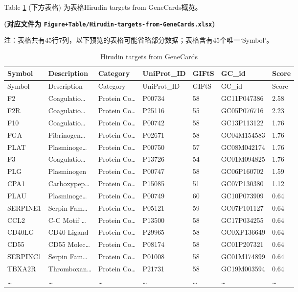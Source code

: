 \documentclass[
]{article}
\begin{document}
Table \ref{tab:Hirudin-targets-from-GeneCards} (下方表格) 为表格Hirudin targets from GeneCards概览。

\textbf{(对应文件为 \texttt{Figure+Table/Hirudin-targets-from-GeneCards.xlsx})}

\begin{center}\begin{tcolorbox}[colback=gray!10, colframe=gray!50, width=0.9\linewidth, arc=1mm, boxrule=0.5pt]注：表格共有45行7列，以下预览的表格可能省略部分数据；表格含有45个唯一`Symbol'。
\end{tcolorbox}
\end{center}

\begin{longtable}[]{@{}lllllll@{}}
\caption{\label{tab:Hirudin-targets-from-GeneCards}Hirudin targets from GeneCards}\tabularnewline
\toprule
Symbol & Description & Category & UniProt\_ID & GIFtS & GC\_id & Score\tabularnewline
\midrule
\endfirsthead
\toprule
Symbol & Description & Category & UniProt\_ID & GIFtS & GC\_id & Score\tabularnewline
\midrule
\endhead
F2 & Coagulatio\ldots{} & Protein Co\ldots{} & P00734 & 58 & GC11P047386 & 2.58\tabularnewline
F2R & Coagulatio\ldots{} & Protein Co\ldots{} & P25116 & 55 & GC05P076716 & 2.23\tabularnewline
F10 & Coagulatio\ldots{} & Protein Co\ldots{} & P00742 & 58 & GC13P113122 & 1.76\tabularnewline
FGA & Fibrinogen\ldots{} & Protein Co\ldots{} & P02671 & 58 & GC04M154583 & 1.76\tabularnewline
PLAT & Plasminoge\ldots{} & Protein Co\ldots{} & P00750 & 57 & GC08M042174 & 1.76\tabularnewline
F3 & Coagulatio\ldots{} & Protein Co\ldots{} & P13726 & 54 & GC01M094825 & 1.76\tabularnewline
PLG & Plasminogen & Protein Co\ldots{} & P00747 & 58 & GC06P160702 & 1.59\tabularnewline
CPA1 & Carboxypep\ldots{} & Protein Co\ldots{} & P15085 & 51 & GC07P130380 & 1.12\tabularnewline
PLAU & Plasminoge\ldots{} & Protein Co\ldots{} & P00749 & 60 & GC10P073909 & 0.64\tabularnewline
SERPINE1 & Serpin Fam\ldots{} & Protein Co\ldots{} & P05121 & 59 & GC07P101127 & 0.64\tabularnewline
CCL2 & C-C Motif \ldots{} & Protein Co\ldots{} & P13500 & 58 & GC17P034255 & 0.64\tabularnewline
CD40LG & CD40 Ligand & Protein Co\ldots{} & P29965 & 58 & GC0XP136649 & 0.64\tabularnewline
CD55 & CD55 Molec\ldots{} & Protein Co\ldots{} & P08174 & 58 & GC01P207321 & 0.64\tabularnewline
SERPINC1 & Serpin Fam\ldots{} & Protein Co\ldots{} & P01008 & 58 & GC01M174899 & 0.64\tabularnewline
TBXA2R & Thromboxan\ldots{} & Protein Co\ldots{} & P21731 & 58 & GC19M003594 & 0.64\tabularnewline
\ldots{} & \ldots{} & \ldots{} & \ldots{} & \ldots{} & \ldots{} & \ldots{}\tabularnewline
\bottomrule
\end{longtable}
\end{document}
